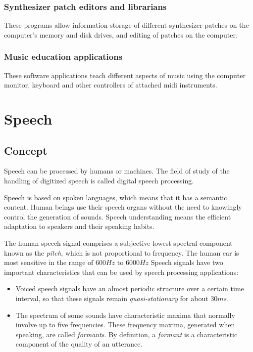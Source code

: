 \subsubsection*{Synthesizer patch editors and librarians}
These programs allow information storage of different synthesizer patches on the computer's memory and disk drives, and editing of patches on the computer.
			
\subsubsection*{Music education applications}
These software applications teach different aspects of music using the computer monitor, keyboard and other controllers of attached \gls{midi} instruments.		


\section{Speech}
\subsection{Concept}
Speech can be processed by humans or machines. The field of study of the handling of digitized speech is called digital speech processing.

Speech is based on spoken languages, which means that it has a semantic content. Human beings use their speech organs without the need to knowingly control the generation of sounds. Speech understanding means the efficient adaptation to speakers and their speaking habits. 


The human speech signal comprises a subjective lowest spectral component known as the \textit{pitch}, which is not proportional to frequency. The human ear is most sensitive in the range of $ 600 Hz $ to $ 6000 Hz $ Speech signals have two important characteristics that can be used by speech processing applications:

\begin{itemize}
	\item Voiced speech signals have an almost periodic	structure over a certain time interval, so that these signals remain \textit{quasi-stationary} for about $ 30ms $.
	
	\item The spectrum of some sounds have characteristic maxima that normally involve up to five frequencies. These frequency maxima, generated when speaking, are called \textit{formants}. By definition, a \textit{formant} is a characteristic component of the quality of an utterance.
\end{itemize}

